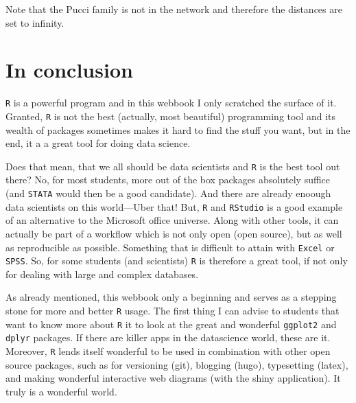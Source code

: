 \documentclass[]{article}
\theoremstyle{definition}
\theoremstyle{definition}
\theoremstyle{definition}
\theoremstyle{remark}
\begin{document}
Note that the Pucci family is not in the network and therefore the
distances are set to infinity.

\section{In conclusion}\label{in-conclusion}

\texttt{R} is a powerful program and in this webbook I only scratched
the surface of it. Granted, \texttt{R} is not the best (actually, most
beautiful) programming tool and its wealth of packages sometimes makes
it hard to find the stuff you want, but in the end, it a a great tool
for doing data science.

Does that mean, that we all should be data scientists and \texttt{R} is
the best tool out there? No, for most students, more out of the box
packages absolutely suffice (and \texttt{STATA} would then be a good
candidate). And there are already enoough data scientists on this
world---Uber that! But, \texttt{R} and \texttt{RStudio} is a good
example of an alternative to the Microsoft office universe. Along with
other tools, it can actually be part of a workflow which is not only
open (open source), but as well as reproducible as possible. Something
that is difficult to attain with \texttt{Excel} or \texttt{SPSS}. So,
for some students (and scientists) \texttt{R} is therefore a great tool,
if not only for dealing with large and complex databases.

As already mentioned, this webbook only a beginning and serves as a
stepping stone for more and better \texttt{R} usage. The first thing I
can advise to students that want to know more about \texttt{R} it to
look at the great and wonderful \texttt{ggplot2} and \texttt{dplyr}
packages. If there are killer apps in the datascience world, these are
it. Moreover, \texttt{R} lends itself wonderful to be used in
combination with other open source packages, such as for versioning
(git), blogging (hugo), typesetting (latex), and making wonderful
interactive web diagrams (with the shiny application). It truly is a
wonderful world.
\end{document}
